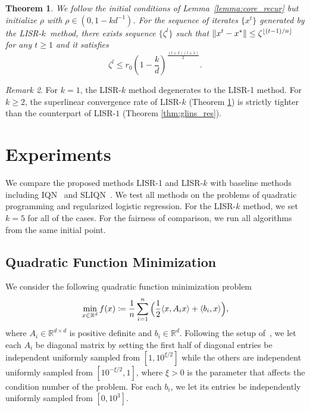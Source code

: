 \documentclass[letterpaper]{article} %
\theoremstyle{plain}
\newtheorem{theorem}{Theorem}[section]
\theoremstyle{definition}
\theoremstyle{remark}
\newtheorem{remark}[theorem]{Remark}
\DeclarePairedDelimiter\floor{\lfloor}{\rfloor}
\newcommand\norm[1]{\left\lVert#1\right\rVert}
\def\BR{{\mathbb{R}}}
\begin{document}
\begin{theorem}
    We follow the initial conditions of Lemma~\ref{lemma:core_recur} but initialize $\rho$ with $\rho\in(0,1-kd^{-1})$. For the sequence of iterates $\{x^t\}$ generated by the LISR-$k$~method, there exists sequence $\{\zeta^l\}$ such that $\norm{x^t-x^*} \leq \zeta^{\floor{(t-1)/n}}$ for any $t\geq 1$ and it satisfies
    \begin{equation}
        \zeta^l \leq r_0 \left(1 - \frac{k}{d}\right)^{\frac{(l+2)(l+1)}{2}}.
        \label{srk_result_eq}
    \end{equation}
    \label{thm:glins+_res}
\end{theorem}
\begin{remark}
For $k = 1$, the LISR-$k$ method degenerates to the LISR-1 method.
For $k\geq 2$, the superlinear convergence rate of LISR-$k$ (Theorem \ref{thm:glins+_res}) is strictly tighter than the counterpart of LISR-$1$ (Theorem \ref{thm:glins_res}).
\end{remark}

\section{Experiments} \label{sec:experiment}
We compare the proposed methods LISR-1 and LISR-$k$ with baseline methods including IQN~\cite{mokhtari2018iqn} and SLIQN~\cite{lahoti2023sharpened}.
We test all methods on the problems of quadratic programming and regularized logistic regression.
For the LISR-$k$ method, we set $k=5$ for all of the cases.
For the fairness of comparison, we run all algorithms from the same initial point.


\subsection{Quadratic Function Minimization}
We consider the following quadratic function minimization problem 
\begin{equation}
\small
    \min_{x\in \BR^d} f(x) \coloneqq \frac{1}{n} \sum_{i=1}^n \Big( \frac{1}{2} \langle x, A_i x\rangle + \langle b_i, x\rangle\Big),
\end{equation}
where $A_i \in \BR^{d \times d}$ is positive definite and $b_i\in\BR^d$. 
Following the setup of~\citet{mokhtari2018iqn}, we let each $A_i$ be diagonal matrix by setting the first half of diagonal entries be independent uniformly sampled from $[1, 10^{\xi / 2}]$ while the others are independent uniformly sampled from $[10^{-\xi / 2}, 1]$, where $\xi>0$ is the parameter that affects the condition number of the problem.
For each $b_i$, we let its entries be independently uniformly sampled from $[0, 10^3]$.
\end{document}

